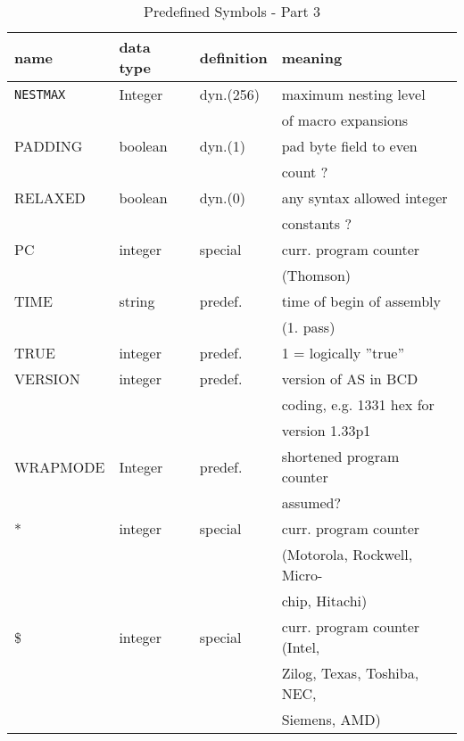 \documentclass[12pt,twoside]{report}
\newcommand{\tty}[1]{{\tt #1}}
\begin{document}
\begin{table*}[htb]
\begin{center}\begin{tabular}{|l|l|l|l|}
\hline
name             &  data type   & definition & meaning \\
\hline\hline
\tty{NESTMAX} &  Integer  & dyn.(256)  & maximum nesting level \\
              &           &            & of macro expansions \\
\hline
PADDING       & boolean   & dyn.(1)    & pad byte field to even \\
              &           &            & count ? \\
RELAXED       & boolean   & dyn.(0)    & any syntax allowed integer \\
              &           &            & constants ? \\
PC            & integer   & special    & curr. program counter \\
              &           &            & (Thomson) \\
TIME          & string    & predef.    & time of begin of assembly \\
              &           &            & (1. pass) \\
TRUE          & integer   & predef.    & 1 = logically ''true'' \\
VERSION       & integer   & predef.    & version of AS in BCD \\
	      &  	  &	       & coding, e.g. 1331 hex for \\
              &           &            & version 1.33p1 \\
WRAPMODE      &  Integer  & predef.    & shortened program counter \\
              &           &            & assumed? \\
*             & integer   & special    & curr. program counter \\
              &           &            &  (Motorola, Rockwell, Micro- \\
              &           &            & chip, Hitachi) \\
\$            & integer   & special    & curr. program counter (Intel, \\
              &           &            & Zilog, Texas, Toshiba, NEC, \\
              &           &            & Siemens, AMD) \\
\hline
\end{tabular}\end{center}
\caption{Predefined Symbols - Part 3\label{TabInternSyms3}}
\end{table*}
\end{document}
